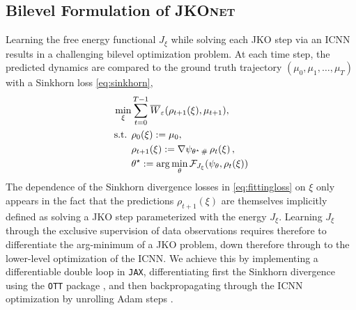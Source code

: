 \subsection{Bilevel Formulation of \textsc{JKOnet}}
Learning the free energy functional $J_\xi$ while solving each \acrshort{JKO} step via an ICNN results in a challenging bilevel optimization problem.
At each time step, the predicted dynamics are compared to the ground truth trajectory $(\mu_0, \mu_1, \dots, \mu_T)$ with a Sinkhorn loss \eqref{eq:sinkhorn},
\begin{align}\label{eq:fittingloss}
\begin{split}
    \min_\xi & \sum_{t=0}^{T-1} \overline{W}_{\varepsilon}(\rho_{t+1}(\xi), \mu_{t+1}), \\
    \text{s.t. } & \rho_{0}(\xi) := \mu_0, \\
      & \rho_{t+1}(\xi) := \nabla \psi_{\theta^\star\, \#}\, \rho_{t}(\xi)\,, \\
      & \theta^\star:=\arg \min_{\theta} \mathcal{F}_{J_{\xi}}(\psi_{\theta},\rho_t(\xi))
\end{split}
\end{align}
The dependence of the Sinkhorn divergence losses in \eqref{eq:fittingloss} on $\xi$ only appears in the fact that the predictions $\rho_{t+1}(\xi)$ are themselves implicitly defined as solving a \acrshort{JKO} step parameterized with the energy $J_\xi$. 
Learning  $J_\xi$ through the exclusive supervision of data observations requires therefore to differentiate the arg-minimum of a \acrshort{JKO} problem, down therefore through to the lower-level optimization of the ICNN. We achieve this by implementing a differentiable double loop in \texttt{JAX}, differentiating first the Sinkhorn divergence using the \texttt{OTT} package \citep{cuturi2022optimal}, and then backpropagating through the ICNN optimization by unrolling Adam steps \citep{kingma2014adam, metz2016unrolled, lorraine2020optimizing}.


